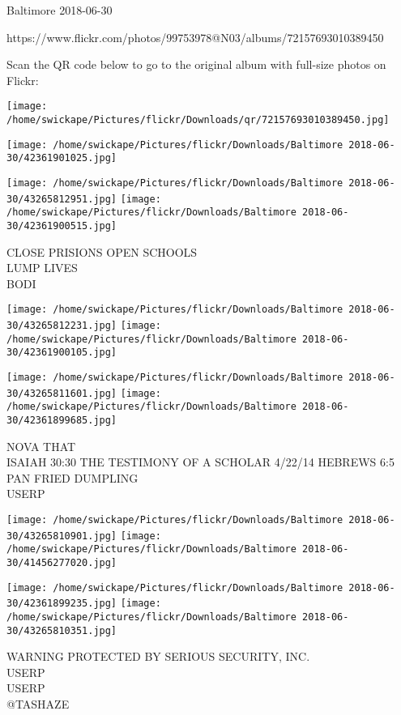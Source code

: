 \documentclass[10pt,letterpaper]{article}
\begin{document}
Baltimore 2018-06-30

https://www.flickr.com/photos/99753978@N03/albums/72157693010389450

Scan the QR code below to go to the original album with full-size photos on Flickr:

\texttt{[image: /home/swickape/Pictures/flickr/Downloads/qr/72157693010389450.jpg]}
\pagebreak

\texttt{[image: /home/swickape/Pictures/flickr/Downloads/Baltimore 2018-06-30/42361901025.jpg]}

\vspace{0.25in}
\texttt{[image: /home/swickape/Pictures/flickr/Downloads/Baltimore 2018-06-30/43265812951.jpg]}
\texttt{[image: /home/swickape/Pictures/flickr/Downloads/Baltimore 2018-06-30/42361900515.jpg]}

CLOSE PRISIONS OPEN SCHOOLS\\
LUMP LIVES\\
BODI
\pagebreak

\texttt{[image: /home/swickape/Pictures/flickr/Downloads/Baltimore 2018-06-30/43265812231.jpg]}
\texttt{[image: /home/swickape/Pictures/flickr/Downloads/Baltimore 2018-06-30/42361900105.jpg]}

\texttt{[image: /home/swickape/Pictures/flickr/Downloads/Baltimore 2018-06-30/43265811601.jpg]}
\texttt{[image: /home/swickape/Pictures/flickr/Downloads/Baltimore 2018-06-30/42361899685.jpg]}

NOVA THAT\\
ISAIAH 30:30 THE TESTIMONY OF A SCHOLAR 4/22/14 HEBREWS 6:5\\
PAN FRIED DUMPLING\\
USERP
\pagebreak

\texttt{[image: /home/swickape/Pictures/flickr/Downloads/Baltimore 2018-06-30/43265810901.jpg]}
\texttt{[image: /home/swickape/Pictures/flickr/Downloads/Baltimore 2018-06-30/41456277020.jpg]}

\texttt{[image: /home/swickape/Pictures/flickr/Downloads/Baltimore 2018-06-30/42361899235.jpg]}
\texttt{[image: /home/swickape/Pictures/flickr/Downloads/Baltimore 2018-06-30/43265810351.jpg]}

WARNING PROTECTED BY SERIOUS SECURITY, INC.\\
USERP\\
USERP\\
@TASHAZE
\pagebreak
\end{document}

